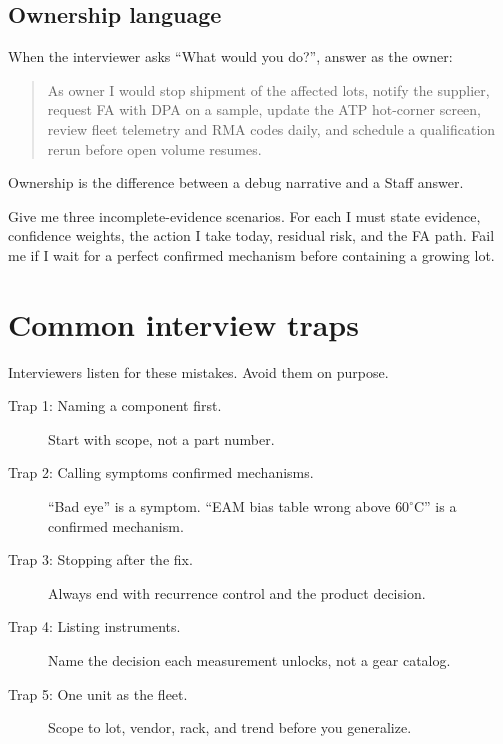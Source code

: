 \subsection{Ownership language}

When the interviewer asks ``What would you do?'', answer as the owner:
\begin{quote}
As owner I would stop shipment of the affected lots, notify the supplier,
request FA with DPA on a sample, update the ATP hot-corner screen, review
fleet telemetry and RMA codes daily, and schedule a qualification rerun
before open volume resumes.
\end{quote}
Ownership is the difference between a debug narrative and a Staff answer.

{Give me three incomplete-evidence scenarios. For each I must state evidence,
confidence weights, the action I take today, residual risk, and the FA path.
Fail me if I wait for a perfect confirmed mechanism before containing a growing lot.}

\section{Common interview traps}
\label{sec:interview-traps}

Interviewers listen for these mistakes. Avoid them on purpose.

\begin{description}
\item[Trap 1: Naming a component first.] Start with scope, not a part number.
\item[Trap 2: Calling symptoms confirmed mechanisms.] ``Bad eye'' is a symptom.
      ``EAM bias table wrong above $60^\circ$C'' is a confirmed mechanism.
\item[Trap 3: Stopping after the fix.] Always end with recurrence control and
      the product decision.
\item[Trap 4: Listing instruments.] Name the decision each measurement unlocks,
      not a gear catalog.
\item[Trap 5: One unit as the fleet.] Scope to lot, vendor, rack, and trend
      before you generalize.
\end{description}



